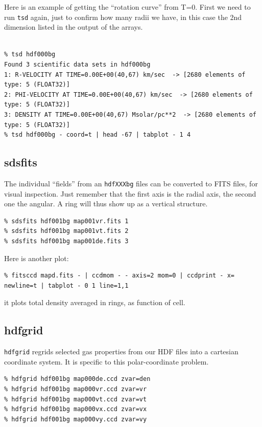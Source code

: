 \documentclass[10pt,dvips]{article}
\begin{document}
{Here is an example of getting the ``rotation curve'' from T=0. First we need to run
{\tt tsd} again, just to confirm how many radii we have, in this case the 2nd
dimension listed in the output of the arrays.

\footnotesize\begin{verbatim}

% tsd hdf000bg
Found 3 scientific data sets in hdf000bg
1: R-VELOCITY AT TIME=0.00E+00(40,67) km/sec  -> [2680 elements of type: 5 (FLOAT32)]
2: PHI-VELOCITY AT TIME=0.00E+00(40,67) km/sec  -> [2680 elements of type: 5 (FLOAT32)]
3: DENSITY AT TIME=0.00E+00(40,67) Msolar/pc**2  -> [2680 elements of type: 5 (FLOAT32)]
% tsd hdf000bg - coord=t | head -67 | tabplot - 1 4

\end{verbatim}\normalsize


\subsection{sdsfits}

The individual ``fields'' from an {\tt hdfXXXbg} files can be converted to FITS files,
for visual inspection. Just remember that the first axis is the radial axis, the
second one the angular.  A ring will thus show up as a vertical structure.

\footnotesize\begin{verbatim}
% sdsfits hdf001bg map001vr.fits 1
% sdsfits hdf001bg map001vt.fits 2
% sdsfits hdf001bg map001de.fits 3
\end{verbatim}\normalsize

Here is another plot:
\footnotesize\begin{verbatim}
% fitsccd mapd.fits - | ccdmom - - axis=2 mom=0 | ccdprint - x= newline=t | tabplot - 0 1 line=1,1
\end{verbatim}\normalsize
it plots total density averaged in rings, as function of cell.

\subsection{hdfgrid}

{\tt hdfgrid}
regrids selected gas properties from our 
HDF files into a cartesian coordinate system. 
It is specific to this polar-coordinate problem.

\footnotesize\begin{verbatim}
% hdfgrid hdf001bg map000de.ccd zvar=den
% hdfgrid hdf001bg map000vr.ccd zvar=vr
% hdfgrid hdf001bg map000vt.ccd zvar=vt
% hdfgrid hdf001bg map000vx.ccd zvar=vx
% hdfgrid hdf001bg map000vy.ccd zvar=vy
\end{verbatim}\normalsize

}
\end{document}
